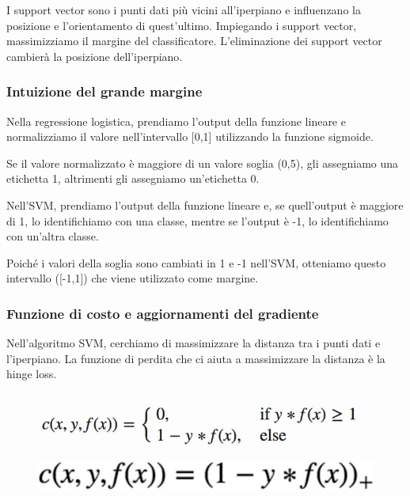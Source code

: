 I support vector sono i punti dati più vicini all'iperpiano e inﬂuenzano la posizione e l'orientamento di quest’ultimo. Impiegando i support vector, massimizziamo il margine del classificatore. L’eliminazione  dei support vector cambierà la posizione dell'iperpiano. 

\subsubsection{Intuizione del grande margine}
Nella regressione logistica, prendiamo l'output della funzione lineare e normalizziamo il valore nell'intervallo  [0,1] utilizzando la funzione sigmoide. 

Se il valore normalizzato è maggiore di un valore soglia (0,5), gli assegniamo una etichetta 1, altrimenti gli assegniamo un'etichetta 0. 

Nell'SVM, prendiamo l'output della funzione lineare e, se quell'output è maggiore di 1, lo identifichiamo con una classe, mentre se l'output è -1, lo identifichiamo con un'altra classe. 

Poiché i valori della soglia sono cambiati in 1 e -1 nell'SVM, otteniamo questo intervallo ([-1,1]) che viene utilizzato come margine.


\subsubsection{Funzione di costo e aggiornamenti del gradiente}
Nell'algoritmo SVM, cerchiamo di massimizzare la distanza tra i punti dati e l'iperpiano. La funzione di perdita che ci aiuta a massimizzare la distanza è la hinge loss.
\begin{figure}[h]
  \begin{minipage}[b]{0.45\linewidth}
    \centering
    \includegraphics[width=\linewidth]{images/image29.jpeg}
  \end{minipage}
  \begin{minipage}[b]{0.45\linewidth}
    \centering
    \includegraphics[width=\linewidth]{images/image30.jpeg}
  \end{minipage}
\end{figure}

